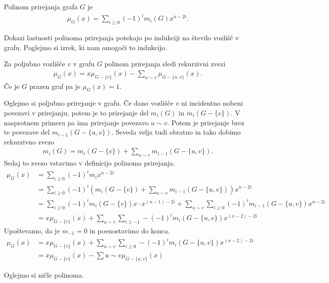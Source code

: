 \begin{definicija}
    Polinom prirejanja grafa \(G\) je
    \begin{align*}
        \mu_G(x) = \sum_{i\geq 0} (-1)^i m_i(G) x^{n-2i}.
    \end{align*}
\end{definicija}

Dokazi lastnosti polinoma prirejanja potekajo po indukciji na število vozlišč v grafu. Poglejmo si izrek, ki nam omogoči to indukcijo.
\begin{izrek}
    Za poljubno vozlišče \(v\) v grafu \(G\) polinom prirejanja sledi rekurzivni zvezi
    \begin{align*}
        \mu_G(x) = x \mu_{G-\{v\}}(x) - \sum_{u\sim v} \mu_{G-\{u, v\}}(x).
    \end{align*}
    Če je \(G\) prazen graf pa je \(\mu_G(x) = 1\).
\end{izrek}
\begin{dokaz}
    Oglejmo si poljubno prirejanje v grafu. Če dano vozlišče \(v\) ni incidentno nobeni povezavi v prirejanju, potem je to prirejanje del \(m_i(G)\) in \(m_i({G-\{v\}})\). V nasprotnem primeru pa ima prirejanje povezavo \(u\sim v\). Potem je prirejanje brez te povezave del \(m_{i-1}({G-\{u, v\}})\). Seveda velja tudi obratno in tako dobimo rekurzivno zvezo
    \begin{align*}
        m_i(G) = m_i({G-\{v\}}) + \sum_{u\sim v} m_{i-1}({G-\{u, v\}}).
    \end{align*}
    Sedaj to zvezo vstavimo v definicijo polinoma prirejanja.
    \begin{align*}
        \mu_G(x) &= \sum_{i\geq 0} (-1)^i m_i x^{n-2i} \\
                 &= \sum_{i\geq 0} (-1)^i \left( m_i({G-\{v\}}) + \sum_{u\sim v} m_{i-1}({G-\{u, v\}}) \right) x^{n-2i} \\
                 &= \sum_{i\geq 0} (-1)^i m_i({G-\{v\}}) x\cdot x^{(n-1)-2i} + \sum_{u\sim v} \sum_{i\geq 0} (-1)^i m_{i-1}({G-\{u, v\}}) x^{n-2i} \\
                 &= x \mu_{G-\{v\}}(x) + \sum_{u\sim v} \sum_{i \geq -1} -(-1)^i m_{i}(G-\{u, v\}) x^{(x-2)-2i}
    \end{align*}
    Upoštevamo, da je \(m_{-1} = 0\) in poenostavimo do konca.
    \begin{align*}
        \mu_G(x) &= x \mu_{G-\{v\}}(x) + \sum_{u\sim v} \sum_{i \geq 0} -(-1)^i m_{i}(G-\{u, v\}) x^{(x-2)-2i} \\
                 &= x \mu_{G-\{v\}}(x) - \sum{u\sim v} \mu_{G-\{u, v\}}(x)
    \end{align*}
\end{dokaz}

Oglejmo si ničle polinoma.

